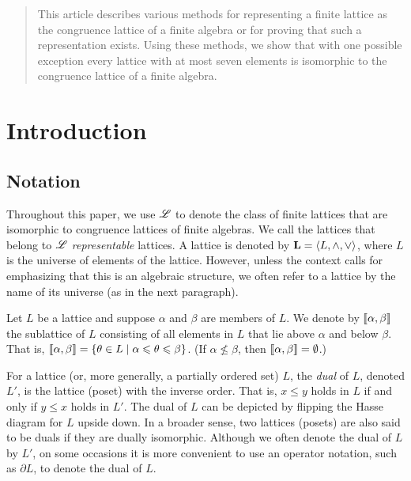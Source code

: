\begin{abstract}
  This article describes various methods for representing a
  finite lattice as the congruence lattice of a finite algebra or for proving
  that such a representation exists. Using these methods, we show that with one
  possible exception every lattice with at most seven elements is isomorphic to
  the congruence lattice of a finite algebra.
\end{abstract}


\maketitle


\section{Introduction}
\label{sec:intro}




\subsection{Notation}

Throughout this paper, we use $\mathscr{L}$ to denote the class of finite lattices that
are isomorphic to congruence lattices of finite algebras. 
We call the lattices that belong to $\mathscr{L}$ \emph{representable} lattices.
A lattice is denoted by $\mathbf{L} = \langle L, \wedge, \vee\rangle$, where $L$
is the universe of elements of the lattice.  However, unless the context
calls for emphasizing that this is an algebraic structure, we often
refer to a lattice by the name of its universe (as in the next paragraph).

Let $L$ be a lattice and suppose $\alpha$ and $\beta$ are members of $L$.  
We denote by $\llbracket \alpha, \beta \rrbracket$ the sublattice of $L$ consisting of all
elements in $L$ that lie above $\alpha$ and below $\beta$.  
That is, 
$\llbracket \alpha, \beta \rrbracket = 
\{\theta \in L \mid \alpha \leqslant \theta \leqslant \beta\}$.
(If $\alpha \nleq \beta$, then $\llbracket \alpha, \beta \rrbracket = \emptyset$.)

For a lattice (or, more generally, a partially ordered set) 
$L$, the \emph{dual} of $L$, denoted
$L'$, is the lattice (poset) with the inverse order. That is, 
$x \leq y$ holds in $L$ if and only if $y \leq x$ holds in $L'$. 
The dual of $L$ can be depicted by flipping the Hasse diagram
for $L$ upside down. 
In a broader sense, two lattices (posets) are also said to be duals if they are
dually isomorphic.
Although we often denote the dual of $L$ by $L'$, on some occasions it is more
convenient to use an operator notation, such as $\partial L$, to denote the dual of
$L$. 

